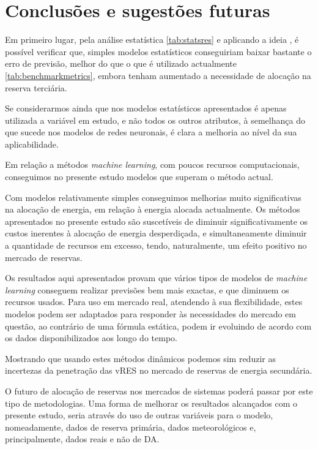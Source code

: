 \chapter{Conclusões e sugestões futuras}

Em primeiro lugar, pela análise estatística \ref{tab:statsres} e aplicando a ideia \cite{Elsayed}, é possível verificar que, simples modelos estatísticos conseguiriam baixar bastante o erro de previsão, melhor do que o que é utilizado actualmente \ref{tab:benchmarkmetrics}, embora tenham aumentado a necessidade de alocação na reserva terciária.\par
Se considerarmos ainda que nos modelos estatísticos apresentados é apenas utilizada a variável em estudo, e não todos os outros atributos, à semelhança do que sucede nos modelos de redes neuronais, é clara a melhoria ao nível da sua aplicabilidade.\par
Em relação a métodos \textit{machine learning}, com poucos recursos computacionais, conseguimos no presente estudo modelos que superam o método actual.\par
Com modelos relativamente simples conseguimos melhorias muito significativas na alocação de energia, em relação à energia alocada actualmente. Os métodos apresentados no presente estudo são suscetíveis de diminuir significativamente os custos inerentes à alocação de energia desperdiçada, e simultaneamente diminuir a quantidade de recursos em excesso, tendo, naturalmente, um efeito positivo no mercado de reservas.\par
Os resultados aqui apresentados provam que vários tipos de modelos de \textit{machine learning} conseguem realizar previsões bem mais exactas, e que diminuem os recursos usados. Para uso em mercado real, atendendo à sua flexibilidade, estes modelos podem ser adaptados para responder às necessidades do mercado em questão, ao contrário de uma fórmula estática, podem ir evoluindo de acordo com os dados disponibilizados aos longo do tempo.\par
Mostrando que usando estes métodos dinâmicos podemos sim reduzir as incertezas da penetração das \gls{vRES} no mercado de reservas de energia secundária.\par
O futuro de alocação de reservas nos mercados de sistemas poderá passar por este tipo de metodologias. Uma forma de melhorar os resultados alcançados com o presente estudo, seria através do uso de outras variáveis para o modelo, nomeadamente, dados de reserva primária, dados meteorológicos e, principalmente, dados reais e não de \gls{DA}.\par
